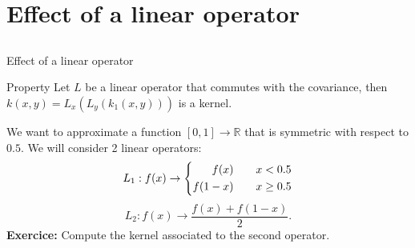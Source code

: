 \documentclass{beamer}
\begin{document}
\section[Linear operator]{Effect of a linear operator}
\subsection{}

\begin{frame}{Effect of a linear operator}
\begin{block}{Property}
Let $L$ be a linear operator that commutes with the covariance, then
$k(x,y) = L_x(L_y(k_1(x,y)))$ is a kernel.
\end{block}
\begin{example}
  We want to approximate a function $[0,1] \rightarrow \mathds{R}$ that is symmetric with respect to $0.5$.
We will consider 2 linear operators:
\begin{equation*}
 L_1 : f(x) \rightarrow 
\left\{ 
\begin{aligned}
 f(x) \text{\qquad}  & x < 0.5 \\
 f(1-x) \text{\qquad}   & x \geq 0.5 
\end{aligned}
\right.
\end{equation*}
$$ L_2 : f(x) \rightarrow \frac{f(x) + f(1-x)}{2}.$$
\textbf{Exercice:} Compute the kernel associated to the second operator.
\end{example}
\end{frame}
\end{document}
